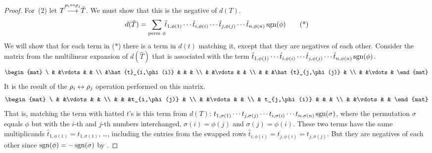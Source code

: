 \begin{proof}
For~(2) let 
\( T\smash[b]{\mathrel{ \mathop{\longrightarrow}\limits^{\rho_i\leftrightarrow\rho_j\mathstrut}_{ \begin{subarray}{l} \relax \end{subarray}}}}\hat{T} \).
We must show that this is the negative of $d(T)$.
\begin{equation*}
  d(\hat{T})=
  \sum_{\text{perm\ }\phi}\!\!
    \hat{t}_{1,\phi(1)}
    \cdots\hat{t}_{i,\phi(i)}
    \cdots\hat{t}_{j,\phi(j)}
    \cdots \hat{t}_{n,\phi(n)}
                                 \operatorname{sgn}(\phi)
    \tag{*}
\end{equation*}
We will show that for each term in ($*$) there is a term in $d(t)$
matching it, except that they are negatives of each other.
Consider the matrix from the multilinear expansion 
of $d(\hat{T})$ that is associated with the term  
    $\hat{t}_{1,\phi(1)}
    \cdots\hat{t}_{i,\phi(i)}
    \cdots\hat{t}_{j,\phi(j)}
    \cdots \hat{t}_{n,\phi(n)}
                                 \operatorname{sgn}(\phi)$.
\begin{equation*}
  \begin{mat}
     \ &                  &\vdots &               &     \\
       &\hat{t}_{i,\phi(i)}  &       &               &    \\
       &                &\vdots &                 &  \\
       &                &       &\hat{t}_{j,\phi(j)} &  \\
       &                &\vdots                   &
  \end{mat}
\end{equation*}
It is the result of the $\rho_i\leftrightarrow\rho_j$ operation performed on this
matrix.
\begin{equation*}
  \begin{mat}
       \ &              &\vdots &           &        \\
         &              &       &t_{i,\phi(j)} &  \\
         &              &\vdots &           &       \\
         &  t_{j,\phi(i)}  &       &          &        \\
         &              &\vdots &          &
  \end{mat}
\end{equation*}
That is, matching the term with hatted $t$'s is 
this term
from $d(T)$:
 \(    t_{1,\sigma(1)}
       \cdots t_{j,\sigma(j)}
       \cdots t_{i,\sigma(i)}
       \cdots t_{n,\sigma(n)} \operatorname{sgn}(\sigma)
       \), where the permutation
\( \sigma \) 
equals \( \phi \) but with the
\( i \)-th and \( j \)-th numbers interchanged,
\( \sigma(i)=\phi(j) \) and \( \sigma(j)=\phi(i) \).
These two terms have the same multiplicands
$\hat{t}_{1,\phi(1)}=t_{1,\sigma(1)}$, \ldots, 
including the entries from the swapped rows
$\hat{t}_{i,\phi(i)}=t_{j,\phi(i)}=t_{j,\sigma(j)}$. 
But they are negatives of each other
since \( \operatorname{sgn}(\phi)=-\operatorname{sgn}(\sigma) \) by .


\end{proof}
